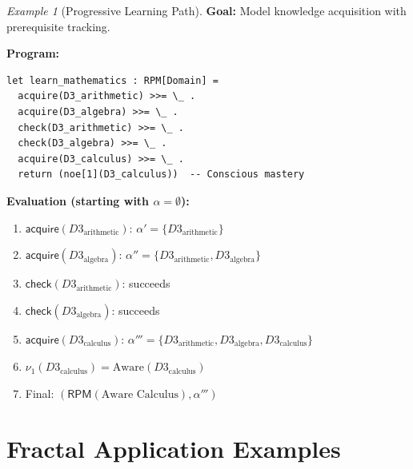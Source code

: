\documentclass[11pt,twoside,openright]{book}
\theoremstyle{definition}
\theoremstyle{plain}
\theoremstyle{remark}
\newtheorem{example}[definition]{Example}
\newcommand{\noe}[1]{\nu_{#1}}
\begin{document}
\begin{example}[Progressive Learning Path]
\label{ex:learning-path}
\textbf{Goal:} Model knowledge acquisition with prerequisite tracking.

\textbf{Program:}
\begin{verbatim}
let learn_mathematics : RPM[Domain] =
  acquire(D3_arithmetic) >>= \_ .
  acquire(D3_algebra) >>= \_ .
  check(D3_arithmetic) >>= \_ .
  check(D3_algebra) >>= \_ .
  acquire(D3_calculus) >>= \_ .
  return (noe[1](D3_calculus))  -- Conscious mastery
\end{verbatim}

\textbf{Evaluation (starting with $\alpha = \emptyset$):}
\begin{enumerate}
\item $\mathsf{acquire}(D3_{\text{arithmetic}})$: $\alpha' = \{D3_{\text{arithmetic}}\}$
\item $\mathsf{acquire}(D3_{\text{algebra}})$: $\alpha'' = \{D3_{\text{arithmetic}}, D3_{\text{algebra}}\}$
\item $\mathsf{check}(D3_{\text{arithmetic}})$: succeeds
\item $\mathsf{check}(D3_{\text{algebra}})$: succeeds
\item $\mathsf{acquire}(D3_{\text{calculus}})$: $\alpha''' = \{D3_{\text{arithmetic}}, D3_{\text{algebra}}, D3_{\text{calculus}}\}$
\item $\noe{1}(D3_{\text{calculus}}) = \text{Aware}(D3_{\text{calculus}})$
\item Final: $(\mathsf{RPM}(\text{Aware Calculus}), \alpha''')$
\end{enumerate}
\end{example}

\section{Fractal Application Examples}
\end{document}
